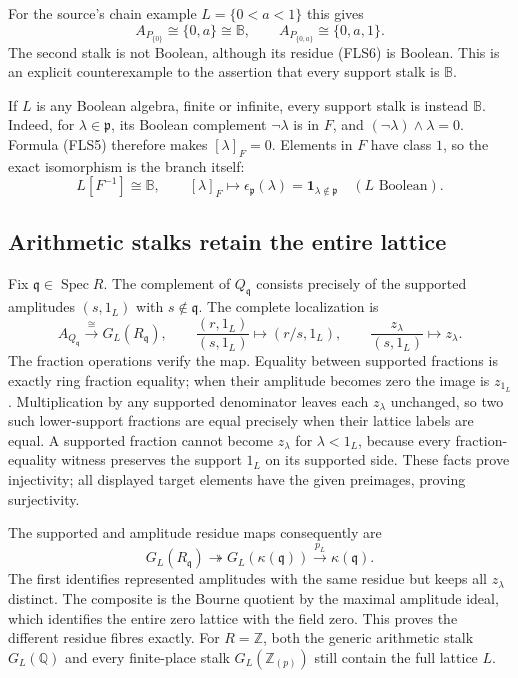 \documentclass[11pt]{article}
\begin{document}
For the source's chain example $L=\{0<a<1\}$ this gives
\[
A_{P_{\{0\}}}\cong\{0,a\}\cong\mathbb B,
\qquad
A_{P_{\{0,a\}}}\cong\{0,a,1\}.
\tag{FLS8}
\]
The second stalk is not Boolean, although its residue (FLS6)
is Boolean. This is an explicit counterexample to the
assertion that every support stalk is $\mathbb B$.

If $L$ is any Boolean algebra, finite or infinite, every
support stalk is instead $\mathbb B$. Indeed, for
$\lambda\in\mathfrak p$, its Boolean complement
$\neg\lambda$ is in $F$, and
$(\neg\lambda)\wedge\lambda=0$. Formula (FLS5) therefore
makes $[\lambda]_F=0$. Elements in $F$ have class $1$,
so the exact isomorphism is the branch itself:
\[
L[F^{-1}]\cong\mathbb B,
\qquad[\lambda]_F\longmapsto
\epsilon_{\mathfrak p}(\lambda)
=\mathbf1_{\lambda\notin\mathfrak p}
\quad(L\text{ Boolean}).
\tag{FLS9}
\]

\subsection{Arithmetic stalks retain the entire lattice}

Fix $\mathfrak q\in\operatorname{Spec}R$.
The complement of $Q_{\mathfrak q}$ consists precisely of
the supported amplitudes $(s,1_L)$ with $s\notin\mathfrak q$.
The complete localization is
\[
A_{Q_{\mathfrak q}}\xrightarrow{\ \cong\ }G_L(R_{\mathfrak q}),
\qquad
\frac{(r,1_L)}{(s,1_L)}\longmapsto(r/s,1_L),
\qquad
\frac{z_\lambda}{(s,1_L)}\longmapsto z_\lambda.
\tag{FLS10}
\]
The fraction operations verify the map. Equality between
supported fractions is exactly ring fraction equality;
when their amplitude becomes zero the image is $z_{1_L}$.
Multiplication by any supported denominator leaves each
$z_\lambda$ unchanged, so two such lower-support fractions
are equal precisely when their lattice labels are equal.
A supported fraction cannot become $z_\lambda$ for
$\lambda<1_L$, because every fraction-equality witness
preserves the support $1_L$ on its supported side. These
facts prove injectivity; all displayed target elements
have the given preimages, proving surjectivity.

The supported and amplitude residue maps consequently are
\[
G_L(R_{\mathfrak q})\twoheadrightarrow
G_L(\kappa(\mathfrak q))\xrightarrow{p_L}\kappa(\mathfrak q).
\tag{FLS11}
\]
The first identifies represented amplitudes with the same
residue but keeps all $z_\lambda$ distinct. The composite
is the Bourne quotient by the maximal amplitude ideal,
which identifies the entire zero lattice with the field
zero. This proves the different residue fibres exactly.
For $R=\mathbb Z$, both the generic arithmetic stalk
$G_L(\mathbb Q)$ and every finite-place stalk
$G_L(\mathbb Z_{(p)})$ still contain the full lattice $L$.
\end{document}
